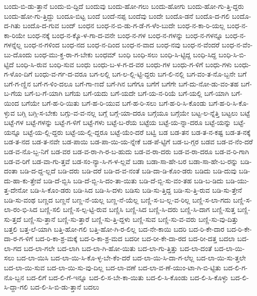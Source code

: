 {ಬಂದು-ಬಿ-ಡು-ತ್ತಾನೆ
ಬಂದು-ಬಿ-ದ್ದಿದೆ
ಬಂದುವು
ಬಂದು-ಹೋ-ಗಲು
ಬಂದು-ಹೋಗು
ಬಂದು-ಹೋ-ಗು-ತ್ತಿ-ದ್ದರು
ಬಂದು-ಹೋ-ಗು-ತ್ತಿದ್ದು
ಬಂದೂ-ಬಿಟ್ಟ
ಬಂದೆ
ಬಂದೆ-ನಪ್ಪ
ಬಂದೆವು
ಬಂದೇ
ಬಂದೊ-ಡನೆ
ಬಂದೊ-ದ-ಗಲಿ
ಬಂದೊ-ದ-ಗಿತು
ಬಂದೊ-ದ-ಗುವ
ಬಂದ್
ಬಂಧನ
ಬಂಧ-ನ-ಬಿ-ಡು-ಗ-ಡೆ-ಗ-ಳೆಂ-ಬುದೇ
ಬಂಧ-ನ-ಕಾ-ರಿ-ಯಲ್ಲ
ಬಂಧ-ನ-ಕಾ-ರಿಯೇ
ಬಂಧ-ನಕ್ಕೆ
ಬಂಧ-ನ-ಕ್ಕೊ-ಳ-ಗಾ-ದ-ವನೇ
ಬಂಧ-ನ-ಗಳ
ಬಂಧ-ನ-ಗಳನ್ನು
ಬಂಧ-ನ-ಗಳನ್ನೂ
ಬಂಧ-ನ-ಗಳನ್ನೆಲ್ಲ
ಬಂಧ-ನ-ಗಳಿಂದ
ಬಂಧ-ನದ
ಬಂಧ-ನ-ದಿಂದ
ಬಂಧ-ನ-ವಾದ
ಬಂಧ-ನವು
ಬಂಧ-ನ-ವೆಂದರೆ
ಬಂಧ-ನ-ವೆಂ-ಬು-ದೊಂದು
ಬಂಧ-ಮು-ಕ್ತ-ರಾ-ಗ-ಬೇಕು
ಬಂಧಮ್
ಬಂಧಿ
ಬಂಧಿ-ಸಲು
ಬಂಧಿ-ಸಿ-ಟ್ಟಿದ್ದ
ಬಂಧಿ-ಸಿದ್ದ
ಬಂಧಿ-ಸಿ-ಬಿ-ಟ್ಟಿದೆ
ಬಂಧಿ-ಸಿ-ರುವ
ಬಂಧಿ-ಸುವ
ಬಂಧು
ಬಂಧು-ಬ-ಳ-ಗ-ದ-ವರ
ಬಂಧು-ಗಳ
ಬಂಧು-ಗ-ಳಿಗೆ
ಬಂಧು-ಗಳು
ಬಂಧು-ಗ-ಳೊಂ-ದಿಗೆ
ಬಂಧು-ವ-ರ್ಗ-ದ-ವರೂ
ಬಗ-ಲಲ್ಲಿ
ಬಗ-ಲ-ಲ್ಲಿ-ಟ್ಟಿ-ದ್ದರು
ಬಗ-ಲಿ-ನಲ್ಲಿ
ಬಗ-ವಂ-ತ-ನೊ-ಬ್ಬನೇ
ಬಗೆ
ಬಗೆ-ಗ-ಣ್ಣಿನ
ಬಗೆ-ಗ-ಳಿಂ-ದಲೂ
ಬಗೆ-ಗಾ-ಣದೆ
ಬಗೆ-ಗಿನ
ಬಗೆಗೂ
ಬಗೆಗೆ
ಬಗೆಗೇ
ಬಗೆ-ದು-ನೋ-ಡು-ವಂ-ತಹ
ಬಗೆ-ಬ-ಗೆಯ
ಬಗೆ-ಬ-ಗೆ-ಯಾಗಿ
ಬಗೆಯ
ಬಗೆ-ಯದು
ಬಗೆ-ಯದೇ
ಬಗೆ-ಯ-ನ-ರಿಯೆ
ಬಗೆ-ಯಲ್ಲಿ
ಬಗೆ-ಯಾಗಿ
ಬಗೆ-ಯಿಂದ
ಬಗೆಯೇ
ಬಗೆ-ಹ-ರಿ-ಯಿತು
ಬಗೆ-ಹ-ರಿ-ಯುವ
ಬಗೆ-ಹ-ರಿ-ಸಲು
ಬಗೆ-ಹ-ರಿ-ಸಿ-ಕೊಂಡು
ಬಗೆ-ಹ-ರಿ-ಸಿ-ಕೊ-ಳ್ಳುವ
ಬಗ್ಗಿ
ಬಗ್ಗಿ-ಸ-ಬೇಕು
ಬಗ್ಗು-ವ-ವ-ನಲ್ಲ
ಬಗ್ಗೆ
ಬಗ್ಗೆ-ಯಾ-ದರೂ
ಬಗ್ಗೆಯೂ
ಬಗ್ಗೆಯೇ
ಬಟ್ಟ-ಲ-ನ್ನೆತ್ತಿ
ಬಟ್ಟಲು
ಬಟ್ಟೆ
ಬಟ್ಟೆ-ಗಳ
ಬಟ್ಟೆ-ಗಳನ್ನು
ಬಟ್ಟೆ-ಗ-ಳಿಗೆ
ಬಟ್ಟೆ-ಗಳು
ಬಟ್ಟೆ-ಬ-ರೆಯ
ಬಟ್ಟೆಯ
ಬಟ್ಟೆ-ಯ-ನ್ನಾ-ದರೂ
ಬಟ್ಟೆ-ಯನ್ನು
ಬಟ್ಟೆ-ಯನ್ನೂ
ಬಟ್ಟೆ-ಯ-ಲ್ಲಿ-ದ್ದರು
ಬಟ್ಟೆ-ಯ-ಲ್ಲಿ-ದ್ದರೂ
ಬಟ್ಟೆ-ಯೆಂ-ದರೆ
ಬಟ್ವಿ
ಬಡ
ಬಡ-ತನ
ಬಡ-ತ-ನ-ಕಷ್ಟ
ಬಡ-ತ-ನಕ್ಕೆ
ಬಡ-ತ-ನದ
ಬಡ-ತ-ನವೇ
ಬಡ-ಪಾಯಿ
ಬಡ-ಪಾ-ಯಿ-ಯ-ನ್ನೇಕೆ
ಬಡ-ಪೆ-ಟ್ಟಿಗೆ
ಬಡ-ಬ-ಗ್ಗರ
ಬಡವ
ಬಡ-ವ-ನೆಂ-ದರೆ
ಬಡ-ವ-ನೊ-ಬ್ಬ-ನಿಗೆ
ಬಡ-ವರ
ಬಡ-ವ-ರಾ-ಗಿ-ರ-ಬ-ಹುದು
ಬಡ-ವ-ರಾ-ದರು
ಬಡ-ವ-ರಾ-ದರೂ
ಬಡ-ವ-ರಿ-ಗಾಗಿ
ಬಡ-ವ-ರಿಗೆ
ಬಡ-ವಾ-ಗು-ತ್ತವೆ
ಬಡ-ಸಂ-ನ್ಯಾ-ಸಿ-ಗ-ಳ-ಲ್ಲವೆ
ಬಡಾ
ಬಡಾ-ಸಾ-ಹೇ-ಬರ
ಬಡಾ-ಸಾ-ಹೇ-ಬ-ರನ್ನು
ಬಡಿ-ದಂತಾ
ಬಡಿ-ದ-ದ್ದ-ಲ್ಲದೆ
ಬಡಿ-ದರು
ಬಡಿ-ದರೆ
ಬಡಿ-ದ-ವ-ನಂತೆ
ಬಡಿ-ದಾ-ಡಿ-ಕೊಂ-ಡರು
ಬಡಿದು
ಬಡಿ-ದುವು
ಬಡಿ-ದು-ಹಾ-ಕು-ತ್ತೇವೆ
ಬಡಿ-ದೆ-ಬ್ಬಿಸಿ
ಬಡಿ-ದೆ-ಬ್ಬಿ-ಸಿ-ದಂ-ತಾ-ಯಿತು
ಬಡಿ-ದೆ-ಬ್ಬಿ-ಸು-ವಂ-ತಹ
ಬಡಿ-ಬ-ಡಿದು
ಬಡಿ-ಯು-ತ್ತ-ದೇನೋ
ಬಡಿ-ಸಿ-ಕೊಂ-ಡರು
ಬಡಿ-ಸಿದ
ಬಡಿ-ಸಿ-ದಳು
ಬಡಿಸು
ಬಡಿ-ಸು-ತ್ತಿದ್ದ
ಬಡಿ-ಸು-ತ್ತಿ-ರುವ
ಬಡಿ-ಸು-ತ್ತೇನೆ
ಬಡಿ-ಸು-ವಂಥ
ಬಣ್ಣದ
ಬಣ್ಣನೆ
ಬಣ್ಣ-ನೆ-ಯಲ್ಲ
ಬಣ್ಣ-ನೆ-ಯೆಲ್ಲ
ಬಣ್ಣಿ-ಸ-ಬ-ಲ್ಲ-ವ-ರಿಲ್ಲ
ಬಣ್ಣಿ-ಸ-ಲಾ-ಗದು
ಬಣ್ಣಿ-ಸ-ಲಾ-ರಂ-ಭಿ-ಸಿದ
ಬಣ್ಣಿ-ಸಲಿ
ಬಣ್ಣಿ-ಸ-ಲ್ಪ-ಟ್ಟಿ-ರುವ
ಬಣ್ಣಿಸಿ
ಬಣ್ಣಿ-ಸಿದ
ಬಣ್ಣಿ-ಸಿ-ದರು
ಬಣ್ಣಿ-ಸಿ-ದಾಗ
ಬಣ್ಣಿ-ಸುತ್ತ
ಬಣ್ಣಿ-ಸು-ತ್ತದೆ
ಬಣ್ಣಿ-ಸು-ತ್ತಾನೆ
ಬಣ್ಣಿ-ಸು-ತ್ತಾರೆ
ಬಣ್ಣಿ-ಸು-ತ್ತಿ-ದ್ದಳು
ಬಣ್ಣಿ-ಸುವ
ಬಣ್ಣಿ-ಸು-ವ-ವರು
ಬಣ್ಣಿ-ಸು-ವು-ದಿತ್ತು
ಬತ್ತಲಿ
ಬತ್ತ-ಲೆ-ಯಾಗಿ
ಬತ್ತಿ-ಹೋ-ಗಲಿ
ಬತ್ತಿ-ಹೋ-ಗಿ-ರ-ಲಿಲ್ಲ
ಬದ-ನೇ-ಕಾಯಿ
ಬದರಿ
ಬದ-ರಿ-ಕೇ-ದಾರ
ಬದ-ರಿ-ಕೇ-ದಾ-ರ-ಗ-ಳಿಗೆ
ಬದ-ರಿ-ಕಾ-ಶ್ರ-ಮಕ್ಕೆ
ಬದ-ರಿ-ಕಾ-ಶ್ರ-ಮದ
ಬದರೀ
ಬದ-ರೀ-ಕೇ-ದಾ-ರದ
ಬದ-ರೀ-ದತ್ತ
ಬದಲಾ
ಬದ-ಲಾ-ಗದ
ಬದ-ಲಾ-ಗಲೇ
ಬದ-ಲಾಗಿ
ಬದ-ಲಾ-ಗಿ-ಹೋ-ಯಿತು
ಬದ-ಲಾ-ಗು-ತ್ತಿತ್ತು
ಬದ-ಲಾ-ದಂತೆ
ಬದ-ಲಾ-ಯಿ-ಸಲು
ಬದ-ಲಾ-ಯಿಸಿ
ಬದ-ಲಾ-ಯಿ-ಸಿ-ಕೊ-ಳ್ಳ-ಬೇ-ಕೆಂ-ದರೆ
ಬದ-ಲಾ-ಯಿ-ಸಿ-ದಾ-ಗ-ಲೆಲ್ಲ
ಬದ-ಲಾ-ಯಿ-ಸು-ತ್ತಲೇ
ಬದ-ಲಾ-ಯಿ-ಸುವ
ಬದ-ಲಾ-ಯಿ-ಸು-ವು-ದಿಲ್ಲ
ಬದ-ಲಾ-ವಣೆ
ಬದ-ಲಾ-ವ-ಣೆ-ಯುಂ-ಟಾ-ಗಿ-ಬಿ-ಟ್ಟಿತು
ಬದ-ಲಿ-ಗ-ನೊ-ಬ್ಬನ
ಬದ-ಲಿಗೆ
ಬದ-ಲಿ-ಗೆ-ಇನ್ನೂ
ಬದ-ಲಿ-ಸ-ಬೇ-ಕಾ-ಯಿತು
ಬದ-ಲಿ-ಸಿ-ಕೊಂಡು
ಬದ-ಲಿ-ಸಿ-ಕೊಳ್ಳು
ಬದ-ಲಿ-ಸಿ-ದ್ದಾ-ಗಲಿ
ಬದ-ಲಿ-ಸಿ-ಬಿ-ಡು-ತ್ತಾನೆ
ಬದಲು
}
